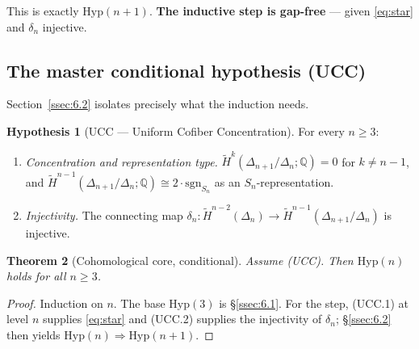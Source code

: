 \documentclass[11pt,reqno]{amsart}
\theoremstyle{plain}
\newtheorem{theorem}{Theorem}[section]
\theoremstyle{definition}
\newtheorem{hypothesis}[theorem]{Hypothesis}
\newcommand{\Hred}{\widetilde H}
\newcommand{\sgn}{\mathrm{sgn}}
\newcommand{\Q}{\mathbb{Q}}
\newcommand{\Hyp}{\mathrm{Hyp}}
\newcommand{\UCC}{\textup{(UCC)}}
\begin{document}
This is exactly $\Hyp(n+1)$. \textbf{The inductive step is gap-free} ---
given \eqref{eq:star} and $\delta_n$ injective.

\subsection{The master conditional hypothesis (UCC)}\label{ssec:6.3}
Section~\ref{ssec:6.2} isolates precisely what the induction needs.

\begin{hypothesis}[UCC --- Uniform Cofiber Concentration]\label{hyp:ucc}
For every $n\ge3$:
\begin{enumerate}[leftmargin=2em,label=\textup{(UCC.\arabic*)}]
  \item \emph{Concentration and representation type.}
        $\Hred^k(\Delta_{n+1}/\Delta_n;\Q)=0$ for $k\ne n-1$, and
        $\Hred^{n-1}(\Delta_{n+1}/\Delta_n;\Q)\cong2\cdot\sgn_{S_n}$ as
        an $S_n$-representation.
  \item \emph{Injectivity.} The connecting map
        $\delta_n:\Hred^{n-2}(\Delta_n)\to\Hred^{n-1}(\Delta_{n+1}/\Delta_n)$
        is injective.
\end{enumerate}
\end{hypothesis}

\begin{theorem}[Cohomological core, conditional]\label{thm:core}
Assume \UCC. Then $\Hyp(n)$ holds for all $n\ge3$.
\end{theorem}
\begin{proof}
Induction on $n$. The base $\Hyp(3)$ is \S\ref{ssec:6.1}. For the step,
(UCC.1) at level $n$ supplies \eqref{eq:star} and (UCC.2) supplies the
injectivity of $\delta_n$; \S\ref{ssec:6.2} then yields
$\Hyp(n)\Rightarrow\Hyp(n+1)$.
\end{proof}
\end{document}
